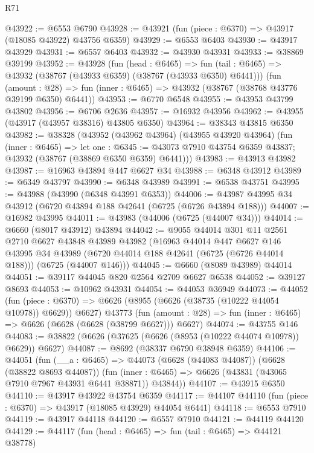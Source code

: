 \begin{lexlean}{R71}
\begin{coremodule}
@43922 := @6553 @6790
@43928 := @43921 (fun (piece : @6370) => @43917 (@18085 @43922) @43756 @6359)
@43929 := @6553 @6403
@43930 := @43917 @43929
@43931 := @6557 @6403
@43932 := @43930 @43931
@43933 := @38869 @39199
@43952 := @43928
    (fun (head : @6465) =>
    fun (tail : @6465) => @43932 (@38767 (@43933 @6359) (@38767 (@43933 @6350) @6441)))
    (fun (amount : @28) =>
    fun (inner : @6465) => @43932 (@38767 (@38768 @43776 @39199 @6350) @6441))
@43953 := @6770 @6548
@43955 := @43953 @43799 @43802
@43956 := @6706 @2636
@43957 := @16932 @43956
@43962 := @43955 (@43917 (@43957 @38316) @43805 @6350)
@43964 := @38343 @43815 @6350
@43982 := @38328
    (@43952
      (@43962 @43964)
      (@43955 @43920 @43964)
      (fun (inner : @6465) =>
      let one : @6345 := @43073 @7910 @43754 @6359 @43837;
      @43932 (@38767 (@38869 @6350 @6359) @6441)))
@43983 := @43913 @43982
@43987 := @16963 @43894 @447 @6627 @34
@43988 := @6348 @43912
@43989 := @6349 @43797
@43990 := @6348 @43989
@43991 := @6538 @43751
@43995 := @43988 (@43990 (@6348 @43991 @6353))
@44006 := @43987 @43995 @34 @43912 (@6720 @43894 @188 @42641 (@6725 (@6726 @43894 @188)))
@44007 := @16982 @43995
@44011 := @43983 (@44006 (@6725 (@44007 @34)))
@44014 := @6660 (@8017 @43912) @43894
@44042 := @9055
    @44014
    @301
    @11
    @2561
    @2710
    @6627
    @43848
    @43989
    @43982
    (@16963
      @44014
      @447
      @6627
      @146
      @43995
      @34
      @43989
      (@6720 @44014 @188 @42641 (@6725 (@6726 @44014 @188)))
      (@6725 (@44007 @146)))
@44045 := @6660 (@8089 @43989) @44014
@44051 := @39117 @44045 @820 @2564 @2709 @6627 @6538
@44052 := @39127 @8693
@44053 := @10962 @43931
@44054 := @44053 @36949
@44073 := @44052
    (fun (piece : @6370) => @6626 (@8955 (@6626 (@38735 (@10222 @44054 @10978)) @6629)) @6627)
    @43773
    (fun (amount : @28) => fun (inner : @6465) => @6626 (@6628 (@6628 (@38799 @6627))) @6627)
@44074 := @43755 @146
@44083 := @38822 (@6626 (@37625 (@6626 (@8953 (@10222 @44074 @10978)) @6629)) @6627)
@44087 := @8692 (@38337 @6790 @38948 @6359)
@44106 := @44051
    (fun (__a : @6465) =>
    @44073
      (@6628 (@44083 @44087))
      (@6628 (@38822 @8693 @44087))
      (fun (inner : @6465) => @6626 (@43831 (@43065 @7910 @7967 @43931 @6441 @38871)) @43844))
@44107 := @43915 @6350
@44110 := @43917 @43922 @43754 @6359
@44117 := @44107 @44110 (fun (piece : @6370) => @43917 (@18085 @43929) @44054 @6441)
@44118 := @6553 @7910
@44119 := @43917 @44118
@44120 := @6557 @7910
@44121 := @44119 @44120
@44129 := @44117
    (fun (head : @6465) => fun (tail : @6465) => @44121 @38778)

\end{coremodule}
\end{lexlean}
